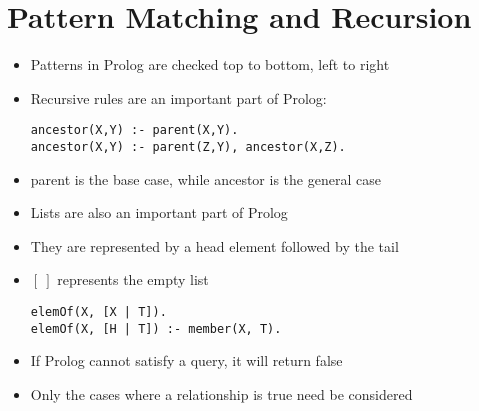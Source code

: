 \documentclass{article}
\begin{document}
\section{Pattern Matching and Recursion}

\begin{itemize}
\item Patterns in Prolog are checked top to bottom, left to right
\item Recursive rules are an important part of Prolog:
\begin{lstlisting}
ancestor(X,Y) :- parent(X,Y).
ancestor(X,Y) :- parent(Z,Y), ancestor(X,Z).
\end{lstlisting}
\item parent is the base case, while ancestor is the general case
\item Lists are also an important part of Prolog
\item They are represented by a head element followed by the tail
\item $[\:]$ represents the empty list
\begin{lstlisting}
elemOf(X, [X | T]).
elemOf(X, [H | T]) :- member(X, T).
\end{lstlisting}
\item If Prolog cannot satisfy a query, it will return false
\item Only the cases where a relationship is true need be considered
\end{itemize}
\end{document}
